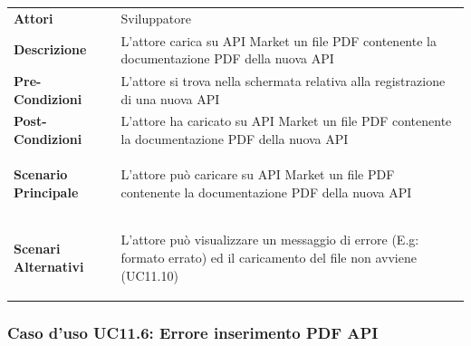 \begin{minipage}{\linewidth}
	\begin{tabular}{ l | p{11cm}}
		\hline
		\rowcolor{Gray}
		\multicolumn{2}{c}{UC11.5 - Inserimento documentazione PDF API} \\
		\hline
		\textbf{Attori} & Sviluppatore \\
		\textbf{Descrizione} & L'attore carica su API Market un file PDF contenente la documentazione PDF della nuova API \\
		\textbf{Pre-Condizioni} & L'attore si trova nella schermata relativa alla registrazione di una nuova API \\
		\textbf{Post-Condizioni} & L'attore ha caricato su API Market un file PDF contenente la documentazione PDF della nuova API \\
		\textbf{Scenario Principale} & 
		\begin{enumerate*}[label=(\arabic*.),itemjoin={\newline}]
			\item L'attore può caricare su API Market un file PDF contenente la documentazione PDF della nuova API
		\end{enumerate*}\\
		\textbf{Scenari Alternativi} & 
		\begin{enumerate*}[label=(\arabic*.),itemjoin={\newline}]
		\item L'attore può visualizzare un messaggio di errore (E.g: formato errato) ed il caricamento del file non avviene (UC11.10)
		\end{enumerate*}\\
	\end{tabular}
\end{minipage}

\subsubsection{Caso d'uso UC11.6: Errore inserimento PDF API}
\label{UC11_6}

